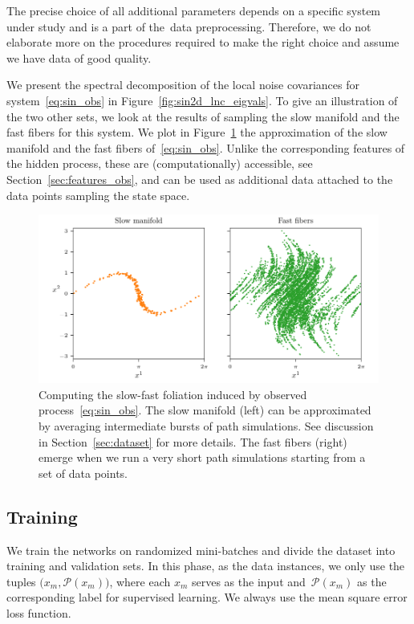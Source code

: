 \documentclass{article}
\newcommand{\proj}{\mathcal{P}} %
\begin{document}
The precise choice of all additional parameters depends on a specific system under study and is a part of the~data preprocessing. Therefore, we do not elaborate more on the procedures required to make the right choice and assume we have data of good quality.

We present the spectral decomposition of the local noise covariances for system~\eqref{eq:sin_obs} in Figure~\ref{fig:sin2d_lnc_eigvals}. To give an illustration of the two other sets, we look at the results of sampling the slow manifold and the fast fibers for this system.
We plot in Figure~\ref{fig:sin2d_fibs_sman} the approximation of the slow manifold and the fast fibers of~\eqref{eq:sin_obs}. Unlike the corresponding features of the hidden process, these are (computationally) accessible, see Section~\ref{sec:features_obs}, and can be used as additional data attached to the data points sampling the state space.
\begin{figure}
    \centering
    \includegraphics[draft=false,width=\textwidth]{figs/sin2d_fibs_sman.pdf}
    \caption{Computing the slow-fast foliation induced by observed process~\eqref{eq:sin_obs}. The slow manifold (left) can be approximated by averaging intermediate bursts of path simulations. See discussion in Section~\ref{sec:dataset} for more details. The fast fibers (right) emerge when we run a very short path simulations starting from a set of data points.}
    \label{fig:sin2d_fibs_sman}
\end{figure}

\subsection{Training}
We train the networks on randomized mini-batches and divide the dataset into training and validation sets. In this phase, as the data instances, we only use the tuples $\big(x_m,\proj(x_m)\big)$, where each $x_m$ serves as the input and~$\proj(x_m)$ as the corresponding label for supervised learning. We always use the mean square error loss function.
\end{document}
